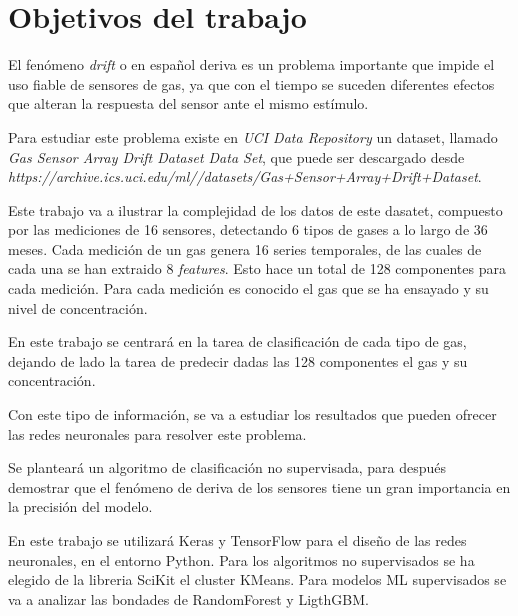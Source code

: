 \chapter{Objetivos del trabajo}

El fenómeno \emph{drift} o en español deriva es un problema importante que impide el uso fiable de sensores de gas,
ya que con el tiempo se suceden diferentes efectos que alteran la respuesta del sensor ante el mismo estímulo.

Para estudiar este problema existe en \emph{UCI Data Repository} un dataset, llamado \emph{Gas Sensor Array Drift Dataset Data Set},
que puede ser descargado desde \emph{https://archive.ics.uci.edu/ml//datasets/Gas+Sensor+Array+Drift+Dataset}.

Este trabajo va a ilustrar la complejidad de los datos de este dasatet, compuesto por las mediciones de 16 sensores,
detectando 6 tipos de gases a lo largo de 36 meses.
Cada medición de un gas genera 16 series temporales,
de las cuales de cada una se han extraido 8 \emph{features}.
Esto hace un total de 128 componentes para cada medición.
Para cada medición es conocido el gas que se ha ensayado y su nivel de concentración.

En este trabajo se centrará en la tarea de clasificación de cada tipo de gas, dejando de lado la tarea de predecir dadas las 128 componentes el gas y su concentración. 

Con este tipo de información, se va a estudiar los resultados que pueden ofrecer las redes neuronales para resolver este problema.

Se planteará un algoritmo de clasificación no supervisada, para después demostrar que el fenómeno de deriva de los sensores tiene un gran importancia en la precisión del modelo.

En este trabajo se utilizará Keras y TensorFlow para el diseño de las redes neuronales, en el entorno Python.
Para los algoritmos no supervisados se ha elegido de la libreria SciKit el cluster KMeans. Para modelos ML supervisados se va a analizar las bondades de RandomForest y LigthGBM.

